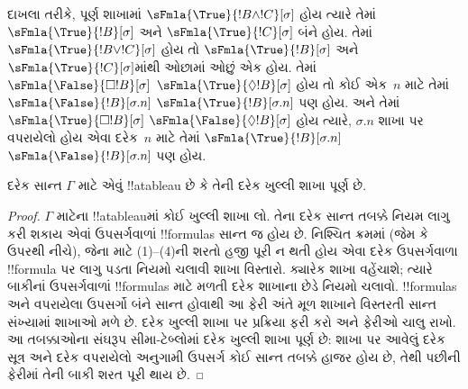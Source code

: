 \documentclass[../../../include/open-logic-section]{subfiles}
\begin{document}
\begin{explain}
દાખલા તરીકે, પૂર્ણ શાખામાં $\sFmla{\True}{!B \land !C}[\sigma]$
હોય ત્યારે તેમાં $\sFmla{\True}{!B}[\sigma]$ અને
$\sFmla{\True}{!C}[\sigma]$ બંને હોય. તેમાં
$\sFmla{\True}{!B \lor !C}[\sigma]$ હોય તો
$\sFmla{\True}{!B}[\sigma]$ અને
$\sFmla{\True}{!C}[\sigma]$માંથી ઓછામાં ઓછું એક હોય.
તેમાં 
{$\sFmla{\False}{\Box !B}[\sigma]$}
{$\sFmla{\True}{\Diamond !B}[\sigma]$} હોય તો કોઈ એક~$n$
માટે તેમાં 
{$\sFmla{\False}{!B}[\sigma.n]$}
{$\sFmla{\True}{!B}[\sigma.n]$} પણ હોય. અને તેમાં
 {$\sFmla{\True}{\Box !B}[\sigma]$}
{$\sFmla{\False}{\Diamond !B}[\sigma]$} હોય ત્યારે,
$\sigma.n$ શાખા પર વપરાયેલો હોય એવા દરેક~$n$ માટે તેમાં
{$\sFmla{\True}{!B}[\sigma.n]$}
{$\sFmla{\False}{!B}[\sigma.n]$} પણ હોય.
\end{explain}

\begin{prop}
  દરેક સાન્ત $\Gamma$ માટે એવું !!a{tableau} છે કે તેની દરેક
  ખુલ્લી શાખા પૂર્ણ છે.
\end{prop}

\begin{proof}
  $\Gamma$ માટેના !!a{tableau}માં કોઈ ખુલ્લી શાખા લો. તેના
  દરેક સાન્ત તબક્કે નિયમ લાગુ કરી શકાય એવાં ઉપસર્ગવાળાં
  !!{formula}s સાન્ત જ હોય છે. નિશ્ચિત ક્રમમાં (જેમ કે ઉપરથી
  નીચે), જેના માટે (1)--(4)ની શરતો હજી પૂરી ન થતી હોય એવા
  દરેક ઉપસર્ગવાળા !!{formula} પર લાગુ પડતા નિયમો ચલાવી
  શાખા વિસ્તારો. ક્યારેક શાખા વહેંચાશે; ત્યારે બાકીનાં
  ઉપસર્ગવાળાં !!{formula}s માટે મળતી દરેક શાખાના છેડે
  નિયમો ચલાવો. !!{formula}s અને વપરાયેલા ઉપસર્ગો બંને સાન્ત હોવાથી
  આ ફેરી અંતે મૂળ શાખાને વિસ્તરતી સાન્ત સંખ્યામાં શાખાઓ
  મળે છે. દરેક ખુલ્લી શાખા પર પ્રક્રિયા ફરી કરો અને ફેરીઓ
  ચાલુ રાખો. આ તબક્કાઓના સંઘરૂપ સીમા-ટેબ્લોમાં દરેક
  ખુલ્લી શાખા પૂર્ણ છે: શાખા પર આવેલું દરેક સૂત્ર અને દરેક
  વપરાયેલો અનુગામી ઉપસર્ગ કોઈ સાન્ત તબક્કે હાજર હોય છે,
  તેથી પછીની ફેરીમાં તેની બાકી શરત પૂરી થાય છે.
\end{proof}
\end{document}
